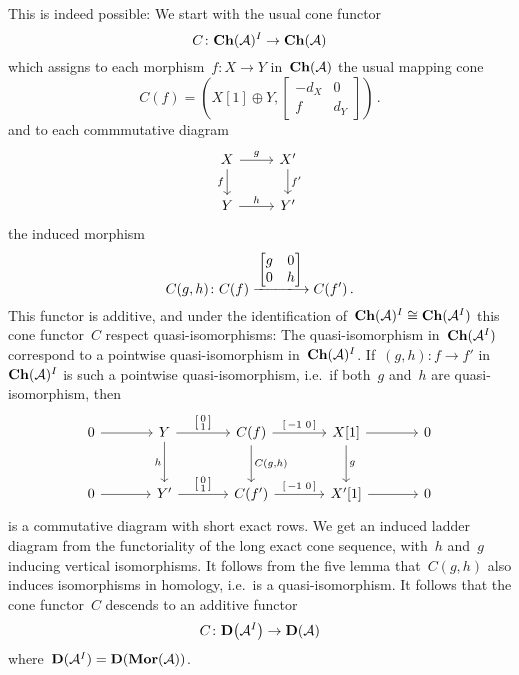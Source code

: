 \documentclass[a4paper,10pt]{scrartcl}
\begin{document}
This is indeed possible:
We start with the usual cone functor
\[
  C
  \colon
  \mathbf{Ch}(\mathcal{A})^I
  \to
  \mathbf{Ch}(\mathcal{A})
\]
which assigns to each morphism~$f \colon X \to Y$ in~$\mathbf{Ch}(\mathcal{A})$ the usual mapping cone
\[
  C(f)
  =
  \left(
  X[1] \oplus Y,
  \begin{bmatrix}
    -d_X & 0   \\
      f   & d_Y
  \end{bmatrix}
\right) \,.
\]
and to each commmutative diagram
\[
  \begin{tikzcd}
    X
    \arrow{r}[above]{g}
    \arrow{d}[left]{f}
    &
    X'
    \arrow{d}[right]{f'}
    \\
    Y
    \arrow{r}[above]{h}
    &
    Y'
  \end{tikzcd}
\]
the induced morphism
\[
  C(g,h)
  \colon
  C(f)
  \xlongto{ \begin{bmatrix} g & 0 \\ 0 & h \end{bmatrix} }
  C(f') \,.
\]
This functor is additive, and under the identification of~$\mathbf{Ch}(\mathcal{A})^I \cong \mathbf{Ch}(\mathcal{A}^I)$ this cone functor~$C$ respect quasi-isomorphisms:
The quasi-isomorphism in~$\mathbf{Ch}(\mathcal{A}^I)$ correspond to a pointwise quasi-isomorphism in~$\mathbf{Ch}(\mathcal{A})^I$.
If~$(g,h) \colon f \to f'$ in~$\mathbf{Ch}(\mathcal{A})^I$ is such a pointwise quasi-isomorphism, i.e.\ if both~$g$ and~$h$ are quasi-isomorphism, then
\[
  \begin{tikzcd}[sep = large, ampersand replacement = \&]
    0
    \arrow{r}
    \&
    Y
    \arrow{r}[above]{\begin{bsmallmatrix} 0 \\ 1 \end{bsmallmatrix}}
    \arrow{d}[left]{h}
    \&
    C(f)
    \arrow{r}[above]{\begin{bsmallmatrix} -1 & 0 \end{bsmallmatrix}}
    \arrow{d}[right]{C(g,h)}
    \&
    X[1]
    \arrow{r}
    \arrow{d}[right]{g}
    \&
    0
    \\
    0
    \arrow{r}
    \&
    Y'
    \arrow{r}[above]{\begin{bsmallmatrix} 0 \\ 1 \end{bsmallmatrix}}
    \&
    C(f')
    \arrow{r}[above]{\begin{bsmallmatrix} -1 & 0 \end{bsmallmatrix}}
    \&
    X'[1]
    \arrow{r}
    \&
    0
  \end{tikzcd}
\]
is a commutative diagram with short exact rows.
We get an induced ladder diagram from the functoriality of the long exact cone sequence, with~$h$ and~$g$ inducing vertical isomorphisms.
It follows from the five lemma that~$C(g,h)$ also induces isomorphisms in homology, i.e.\ is a quasi-isomorphism.
It follows that the cone functor~$C$ descends to an additive functor
\[
  C
  \colon
  \mathbf{D}\bigl( \mathcal{A}^I \bigr)
  \to
  \mathbf{D}( \mathcal{A} )
\]
where~$\mathbf{D}(\mathcal{A}^I) = \mathbf{D}(\mathbf{Mor}(\mathcal{A}))$.
\end{document}
